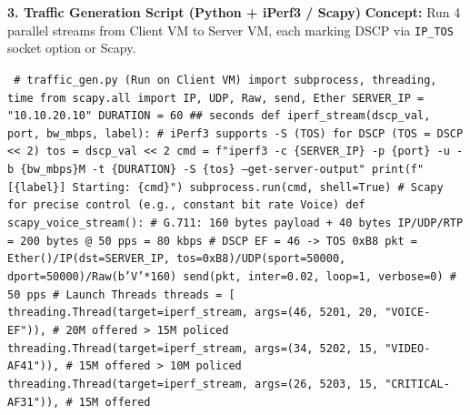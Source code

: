 \documentclass[11pt]{article}
\begin{document}
\begin{exoresolu}
\noindent\textbf{3. Traffic Generation Script (Python + iPerf3 / Scapy)}
\textbf{Concept:} Run 4 parallel streams from Client VM to Server VM, each marking DSCP via \texttt{IP\_TOS} socket option or Scapy.
\begin{flushleft}
\texttt{
\# traffic\_gen.py (Run on Client VM)\newline
import subprocess, threading, time\newline
from scapy.all import IP, UDP, Raw, send, Ether\newline
\newline
SERVER\_IP = "10.10.20.10"\newline
DURATION = 60 \#\# seconds\newline
\newline
def iperf\_stream(dscp\_val, port, bw\_mbps, label):\newline
    \# iPerf3 supports -S (TOS) for DSCP (TOS = DSCP << 2)\newline
    tos = dscp\_val << 2\newline
    cmd = f"iperf3 -c \{SERVER\_IP\} -p \{port\} -u -b \{bw\_mbps\}M -t \{DURATION\} -S \{tos\} --get-server-output"\newline
    print(f"[\{label\}] Starting: \{cmd\}")\newline
    subprocess.run(cmd, shell=True)\newline
\newline
\# Scapy for precise control (e.g., constant bit rate Voice)\newline
def scapy\_voice\_stream():\newline
    \# G.711: 160 bytes payload + 40 bytes IP/UDP/RTP = 200 bytes @ 50 pps = 80 kbps\newline
    \# DSCP EF = 46 -> TOS 0xB8\newline
    pkt = Ether()/IP(dst=SERVER\_IP, tos=0xB8)/UDP(sport=50000, dport=50000)/Raw(b'V'*160)\newline
    send(pkt, inter=0.02, loop=1, verbose=0)  \# 50 pps\newline
\newline
\# Launch Threads\newline
threads = [\newline
    threading.Thread(target=iperf\_stream, args=(46, 5201, 20, "VOICE-EF")),      \# 20M offered > 15M policed\newline
    threading.Thread(target=iperf\_stream, args=(34, 5202, 15, "VIDEO-AF41")),    \# 15M offered > 10M policed\newline
    threading.Thread(target=iperf\_stream, args=(26, 5203, 15, "CRITICAL-AF31")), \# 15M offered\newline
}
\end{flushleft}
\end{exoresolu}
\end{document}
